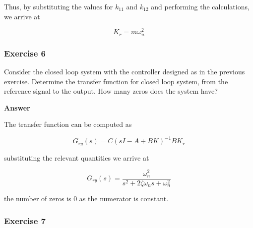 Thus, by substituting the values for $k_{11}$ and $k_{12}$ and performing the calculations, we arrive at 

\begin{equation}
K_r = m\omega_{n}^{2}
\end{equation}

\subsubsection{Exercise 6}

Consider the closed loop system with the controller designed as in the previous exercise. Determine the transfer function for closed loop system, from the reference signal to the output.  How many zeros does the system have?

\textbf{Answer}

The transfer function can be computed as

\begin{equation}
G_{ry}(s) = C(sI - A + BK)^{-1}BK_r \nonumber
\end{equation}

substituting the relevant quantities we arrive at

\begin{equation}
G_{ry}(s) = \frac{\omega_{n}^{2}}{s^2 + 2\zeta\omega_n s + \omega_{n}^{2}}  \nonumber
\end{equation}

the number of zeros is 0 as the numerator is constant.

\subsubsection{Exercise 7}

